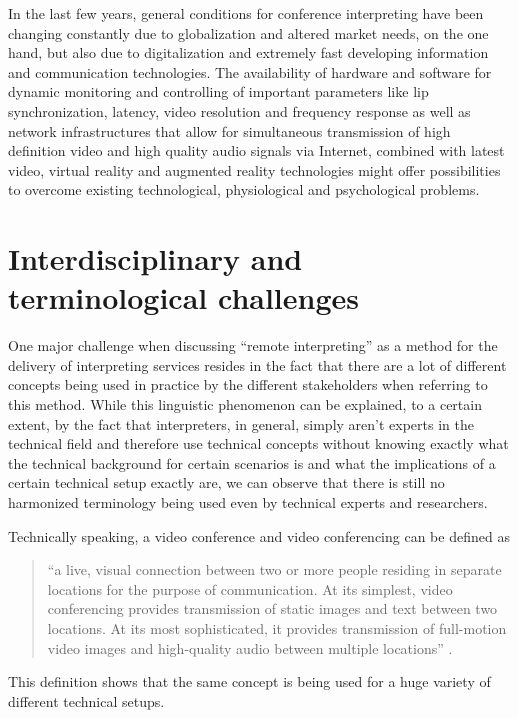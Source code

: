 \documentclass[output=paper]{langsci/langscibook}
\begin{document}
In the last few years, general conditions for conference interpreting have been changing constantly due to globalization and altered market needs, on the one hand, but also due to digitalization and extremely fast developing information and communication technologies. The availability of hardware and software for dynamic monitoring and controlling of important parameters like lip synchronization, latency, video resolution and frequency response as well as network infrastructures that allow for simultaneous transmission of high definition video and high quality audio signals via Internet, combined with latest video, virtual reality and augmented reality technologies might offer possibilities to overcome existing technological, physiological and psychological problems. 

\section{Interdisciplinary and terminological challenges}

One major challenge when discussing “remote interpreting” as a method for the delivery of interpreting services resides in the fact that there are a lot of different concepts being used in practice by the different stakeholders when referring to this method. While this linguistic phenomenon can be explained, to a certain extent, by the fact that interpreters, in general, simply aren’t experts in the technical field and therefore use technical concepts without knowing exactly what the technical background for certain scenarios is and what the implications of a certain technical setup exactly are, we can observe that there is still no harmonized terminology being used even by technical experts and researchers. 

Technically speaking, a video conference and video conferencing can be defined as 

\begin{quote}
	“a live, visual connection between two or more people residing in separate locations for the purpose of communication. At its simplest, video conferencing provides transmission of static images and text between two locations. At its most sophisticated, it provides transmission of full-motion video images and high-quality audio between multiple locations” \citep{TechTarget2017}.
\end{quote}

This definition shows that the same concept is being used for a huge variety of different technical setups.
\end{document}
